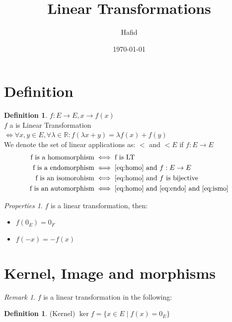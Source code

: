 \documentclass{article}
\title{Linear Transformations}
\author{Hafid}
\date{\today}
\theoremstyle{definition}
\newtheorem{definition}[theorem]{Definition}
\theoremstyle{remark}
\newtheorem{remark}[theorem]{Remark}
\newtheorem{prop}[theorem]{Properties}
\numberwithin{equation}{section}
\begin{document}
\maketitle
\tableofcontents

\section{Definition}

    \begin{definition}
        \(f : E \to E, x \to f(x)\) \\
        \(f\) a is Linear Transformation \(\iff \forall x, y \in E, \forall \lambda \in \mathbb{R} : f(\lambda x + y) = \lambda f(x) + f(y)\) \\
        We denote the set of linear applications as: \( \lt \) and \( \lt{E}\) if \(f : E \to E\)
        \begin{align}
        \text{f is a homomorphism} &\iff \text{f is LT}\label{eq:homo}\\
        \text{f is a endomorphism} &\iff \text{\eqref{eq:homo}  and } f  : E \to E\label{eq:endo} \\
        \text{f is an isomorohism} &\iff \text{\eqref{eq:homo}  and $f$ is bijective}\label{eq:ismo}\\
        \text{f is an automorphism} &\iff \text{\eqref{eq:homo} and~\eqref{eq:endo} and~\eqref{eq:ismo}}
        \end{align}
    \end{definition}

    \begin{prop}
        \(f\) is a linear transformation, then:
        \begin{itemize}
            \item \(f(0_{E}) = 0_{F}\)
            \item \(f(-x) = - f(x)\)
        \end{itemize}
    \end{prop}

\section{Kernel, Image and morphisms}
\begin{remark}
    \(f\) is a linear transformation in the following:
\end{remark}

\begin{definition} (Kernel)
    \( \ker f = \{x \in E \mid  f(x) = 0_{E}\} \)
\end{definition}
\end{document}
